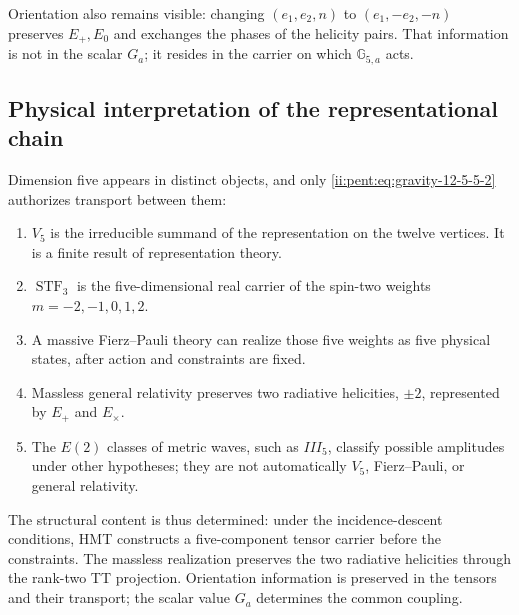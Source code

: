 Orientation also remains visible: changing
\((e_1,e_2,n)\) to \((e_1,-e_2,-n)\) preserves \(E_+,E_0\) and exchanges
the phases of the helicity pairs. That information is not in the
scalar \(G_a\); it resides in the carrier on which
\(\mathbb G_{5,a}\) acts.

\subsection{Physical interpretation of the representational chain}

Dimension five appears in distinct objects, and only
\eqref{ii:pent:eq:gravity-12-5-5-2} authorizes transport between them:

\begin{enumerate}
\item \(V_5\) is the irreducible summand of the representation on the
twelve vertices. It is a finite result of representation theory.
\item \(\operatorname{STF}_3\) is the five-dimensional real carrier of
the spin-two weights \(m=-2,-1,0,1,2\).
\item A massive Fierz--Pauli theory can realize those five weights
as five physical states, after action and constraints are fixed.
\item Massless general relativity preserves two radiative helicities,
\(\pm2\), represented by \(E_+\) and \(E_\times\).
\item The \(E(2)\) classes of metric waves, such as \(III_5\), classify
possible amplitudes under other hypotheses; they are not automatically
\(V_5\), Fierz--Pauli, or general relativity.
\end{enumerate}

The structural content is thus determined: under the incidence-descent
conditions, HMT constructs a five-component tensor carrier
before the constraints. The massless realization preserves
the two radiative helicities through the rank-two TT projection.
Orientation information is preserved in the tensors and their
transport; the scalar value \(G_a\) determines the common coupling.
